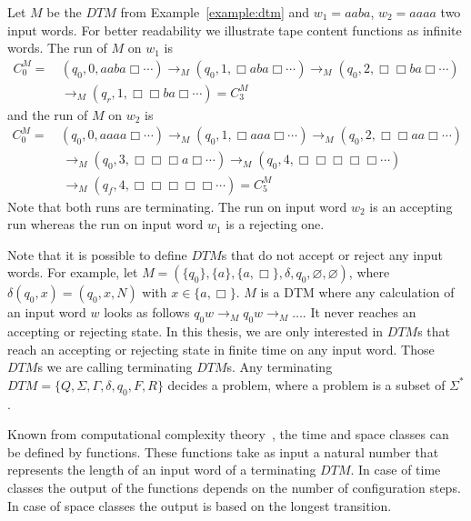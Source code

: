 \begin{example}
    \label{example:run_of_dtm}
    Let $M$ be the $\mathit{DTM}$ from Example~\ref{example:dtm} and $w_1 = aaba$, $w_2 = aaaa$ two input words. For
    better readability we illustrate tape content functions as infinite words. The run of $M$ on $w_1$ is
    \begin{align*}
        C_0^M = &\,(q_0, 0, aaba\Box \dotsb) \rightarrow_M (q_0, 1, \Box aba\Box \dotsb) \rightarrow_M  (q_0, 2, \Box \Box
        ba\Box \dotsb)\\&\, \rightarrow_M (q_r, 1, \Box \Box ba\Box \dotsb) = C_3^M
    \end{align*}
    and the run of $M$ on $w_2$ is
    \begin{align*}
        C_0^M =\,&(q_0, 0, aaaa\Box \dotsb) \rightarrow_M (q_0, 1, \Box aaa\Box \dotsb) \rightarrow_M (q_0, 2, \Box \Box
        aa\Box \dotsb) \\&\,\rightarrow_M
        (q_0, 3, \Box \Box \Box a\Box \dotsb) \rightarrow_M (q_0, 4, \Box \Box \Box \Box \Box \dotsb) \\&\,\rightarrow_M
        (q_f, 4, \Box \Box \Box \Box \Box \dotsb) = C_5^M
    \end{align*}
    Note that both runs are terminating. The run on input word $w_2$ is an accepting run whereas the run on input word $w_1$ is a rejecting one.
\end{example}

Note that it is possible to define $\mathit{DTM}$s that do not accept or reject any input words. For example, let
$M = (\{q_0\}, \{a\}, \{a, \Box\}, \delta, q_0, \varnothing, \varnothing)$, where $\delta(q_0, x) = (q_0, x, N)$ with $x \in
\{a, \Box\}$. $M$ is a DTM where any calculation of an input word $w$ looks as follows $q_0w \rightarrow_M q_0w
\rightarrow_M \dots$. It never reaches an accepting or rejecting state. In this thesis, we are only interested in
$\mathit{DTM}$s that reach an accepting or rejecting state in finite time on any input word. Those $\mathit{DTM}$s
we are calling terminating $\mathit{DTM}$s. Any terminating $\mathit{DTM} = \{Q, \Sigma, \Gamma, \delta, q_0, F, R\}$ decides a problem, where a problem is a subset of $\Sigma^*$.

Known from computational complexity theory~\cite{papadimitriou1994complexity}, the time and space classes
can be defined by functions. These functions take as input a natural number that represents the length of an input
word of a terminating $\mathit{DTM}$. In case of time classes the output of the functions depends on the number of
configuration steps. In case of space classes the output is based on the longest transition.

